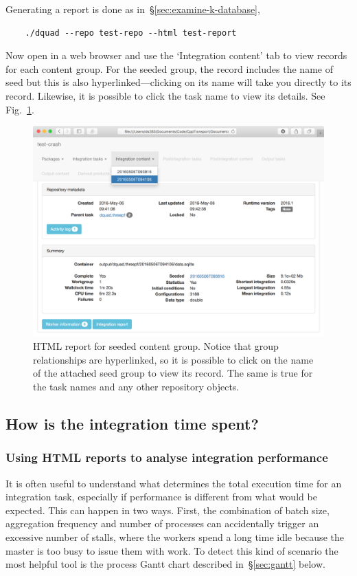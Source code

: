 \documentclass[11pt,a4paper]{article}
\renewcommand{\texttt}[1]{{\ttfamily\fontseries{l}\selectfont{#1}}}
\newcommand{\file}[1]{\texttt{{#1}}}
\begin{document}
Generating a report is done as in~\S\ref{sec:examine-k-database},
\begin{verbatim}
    ./dquad --repo test-repo --html test-report
\end{verbatim}
Now open \file{test-report/index.html} in a web browser
and
use the `Integration content' tab to view records for each
content group.
For the seeded group, the record includes the name of
seed but this is also hyperlinked---clicking on its name will take
you directly to its record.
Likewise, it is possible to click the task name to view
its details.
See Fig.~\ref{fig:seeded-group-report}.
\begin{figure}
    \begin{center}
        \includegraphics[scale=0.2]{Screenshots/seeded-task}    
    \end{center}
    \caption{\label{fig:seeded-group-report}HTML report for seeded
    content group.
    Notice that group relationships are hyperlinked, so it is possible
    to click on the name of the attached seed group to view its
    record.
    The same is true for the task names and any other repository objects.}
\end{figure}

\subsection{How is the integration time spent?}

\subsubsection{Using HTML reports to analyse integration performance}
\label{sec:HTML-analysis}
It is often useful to understand what determines the total execution time
for an integration task,
especially if performance is different from
what would be expected.
This can happen in two ways.
First, the combination of batch size, aggregation frequency and
number of processes can accidentally trigger an excessive number of stalls,
where the workers spend a long time idle because the master is too busy
to issue them with work.
To detect this kind of scenario the most helpful tool is the process
Gantt chart described in~\S\ref{sec:gantt} below.
\end{document}
